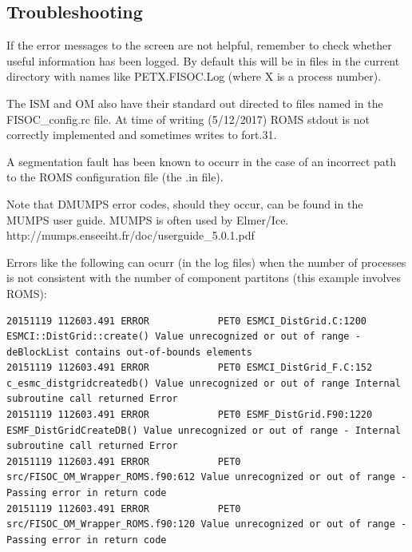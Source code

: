 \documentclass[12pt]{article}
\begin{document}
\subsection{Troubleshooting}

If the error messages to the screen are not helpful, remember to check whether useful 
information has been logged.  By default this will be in files in the current directory 
with names like PETX.FISOC.Log (where X is a process number).

The ISM and OM also have their standard out directed to files named in the 
FISOC\_config.rc file. 
At time of writing (5/12/2017) ROMS stdout is not correctly implemented and sometimes 
writes to fort.31.

A segmentation fault has been known to occurr in the case of an incorrect path to the ROMS 
configuration file (the .in file). 

Note that DMUMPS error codes, should they occur, can be found in the MUMPS user guide.
MUMPS is often used by Elmer/Ice.
http://mumps.enseeiht.fr/doc/userguide\_5.0.1.pdf

Errors like the following can ocurr (in the log files) when the number of processes is 
not consistent with the number of component partitons (this example involves ROMS):
\begin{lstlisting}
20151119 112603.491 ERROR            PET0 ESMCI_DistGrid.C:1200 ESMCI::DistGrid::create() Value unrecognized or out of range - deBlockList contains out-of-bounds elements
20151119 112603.491 ERROR            PET0 ESMCI_DistGrid_F.C:152 c_esmc_distgridcreatedb() Value unrecognized or out of range Internal subroutine call returned Error
20151119 112603.491 ERROR            PET0 ESMF_DistGrid.F90:1220 ESMF_DistGridCreateDB() Value unrecognized or out of range - Internal subroutine call returned Error
20151119 112603.491 ERROR            PET0 src/FISOC_OM_Wrapper_ROMS.f90:612 Value unrecognized or out of range - Passing error in return code
20151119 112603.491 ERROR            PET0 src/FISOC_OM_Wrapper_ROMS.f90:120 Value unrecognized or out of range - Passing error in return code
\end{lstlisting}
\end{document}
